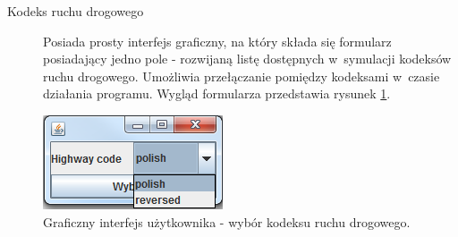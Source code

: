 \documentclass[a4paper,11pt]{article}
\begin{document}
\begin{description}
    \item[Kodeks ruchu drogowego] Posiada prosty interfejs graficzny, na który składa się formularz posiadający jedno pole - rozwijaną listę dostępnych w~symulacji kodeksów ruchu drogowego. Umożliwia przełączanie pomiędzy kodeksami w~czasie działania programu. Wygląd formularza przedstawia rysunek \ref{img:highway_code_selector}.
\end{description}

\begin{figure}[ht!]
    \centering
    \includegraphics{gui_highway_code_selector.png}
    \caption{Graficzny interfejs użytkownika - wybór kodeksu ruchu drogowego.}
    \label{img:highway_code_selector}
\end{figure}
\end{document}
